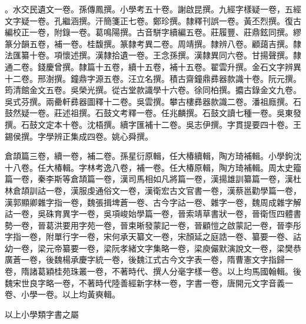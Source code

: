 \begin{pinyinscope}
。水交民遺文一卷。孫傳鳳撰。小學考五十卷。謝啟昆撰。九經字樣疑一卷，五經文字疑一卷。孔繼涵撰。汗簡箋正七卷。鄭珍撰。隸釋刊誤一卷。黃丕烈撰。復古編校正一卷，附錄一卷。葛鳴陽撰。古音駢字續編五卷。莊履豐、莊鼎鉉同撰。繆篆分韻五卷，補一卷。桂馥撰。篆隸考異二卷。周靖撰。隸辨八卷。顧藹吉撰。隸法匯纂十卷。項懷述撰。漢隸拾遺一卷。王念孫撰。漢隸異同六卷。甘揚聲撰。隸通二卷。錢慶曾撰。隸篇十五卷，續十五卷，補十五卷。翟雲升撰。金石文字辨異十二卷。邢澍撰。鐘鼎字源五卷。汪立名撰。積古齋鐘鼎彞器款識十卷。阮元撰。筠清館金文五卷。吳榮光撰。從古堂款識學十六卷。徐同柏撰。攟古錄金文九卷。吳式芬撰。兩罍軒彞器圖釋十二卷。吳雲撰。攀古樓彞器款識二卷。潘祖廕撰。石鼓然疑一卷。莊述祖撰。石鼓文考釋一卷。任兆麟撰。石鼓文讀七種一卷。吳東發撰。石鼓文定本十卷。沈梧撰。續字匯補十二卷。吳志伊撰。字貫提要四十卷。王錫侯撰。字學辨正集成四卷。姚心舜撰。

倉頡篇三卷，續一卷，補二卷。孫星衍原輯，任大椿續輯，陶方琦補輯。小學鉤沈十八卷。任大椿輯。字林考逸八卷，補一卷。任大椿原輯，陶方琦補輯。周太史籀篇一卷，秦李斯等倉頡篇一卷，漢司馬相如凡將篇一卷，漢揚雄訓纂篇一卷，漢杜林倉頡訓詁一卷，漢服虔通俗文一卷，漢衛宏古文官書一卷，漢蔡邕勸學篇一卷，漢郭顯卿雜字指一卷，魏張揖埤蒼一卷、古今字詁一卷、雜字一卷，魏周成雜字解詁一卷，吳硃育異字一卷，吳項峻始學篇一卷，晉索靖草書狀一卷，晉衛恆四體書勢一卷，晉葛洪要用字苑一卷，晉束晰發蒙記一卷，晉顧愷之啟蒙記一卷，晉李彤字指一卷，附單行字一卷，宋何承天纂文一卷，宋顏延之庭誥一卷、纂要一卷、詁幼一卷，梁元帝纂要一卷，梁阮孝緒文字集略一卷，梁庾儼默演說文一卷，梁樊恭廣蒼一卷，後魏楊承慶字統一卷，後魏江式古今文字表一卷，隋曹憲文字指歸一卷，隋諸葛穎桂苑珠叢一卷，不著時代、撰人分毫字樣一卷。以上均馬國翰輯。後魏宋世良字略一卷，不著時代陸善經新字林一卷，字書一卷，唐開元文字音義一卷、小學一卷。以上均黃奭輯。

以上小學類字書之屬


\end{pinyinscope}
